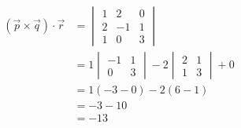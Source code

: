 \documentclass[a4paper,12pt,fleqn]{article}
\begin{document}
\begin{answer}
\begin{align*}
  \left(\vec{p} \times \vec{q}\right) \cdot \vec{r}
  & = \begin{vmatrix}
    1 & 2  & 0 \\
    2 & -1 & 1 \\
    1 & 0  & 3
  \end{vmatrix}
  \\
  & = 1
    \begin{vmatrix}
      -1 & 1 \\
      0  & 3
    \end{vmatrix}
    - 2
    \begin{vmatrix}
      2 & 1 \\
      1 & 3
    \end{vmatrix}
    + 0
  \\
  & = 1(-3-0) -2(6-1) \\
  & = -3 - 10 \\
  & = -13
\end{align*}
\end{answer}

\end{document}
